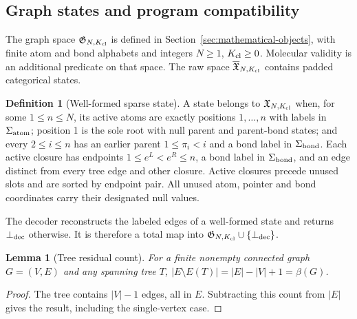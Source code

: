 \documentclass{article}
\newtheorem{lemma}[theorem]{Lemma}
\theoremstyle{definition}
\newtheorem{definition}[theorem]{Definition}
\begin{document}
\subsection{Graph states and program compatibility}
\label{app:state-support}

The graph space $\mathfrak G_{N,K_{\rm cl}}$ is defined in
Section~\ref{sec:mathematical-objects}, with finite atom and bond alphabets and integers $N\geq1$,
$K_{\rm cl}\geq0$. Molecular validity is an additional predicate on that space.
The raw space $\overline{\mathfrak X}_{N,K_{\rm cl}}$ contains padded categorical states.

\begin{definition}[Well-formed sparse state]
\label{def:sparse-state}
A state belongs to $\mathfrak X_{N,K_{\rm cl}}$ when, for some $1\leq n\leq N$, its active atoms
are exactly positions $1,\ldots,n$ with labels in $\Sigma_{\rm atom}$; position 1 is the sole root
with null parent and parent-bond states; and every $2\leq i\leq n$ has an earlier parent
$1\leq\pi_i<i$ and a bond label in $\Sigma_{\rm bond}$. Each active closure has endpoints
$1\leq e^L<e^R\leq n$, a bond label in $\Sigma_{\rm bond}$, and an edge distinct from every tree
edge and other closure. Active closures precede unused slots and are sorted by endpoint pair.
All unused atom, pointer and bond coordinates carry their designated null values.
\end{definition}
The decoder reconstructs the labeled edges of a well-formed state and returns $\bot_{\rm dec}$
otherwise. It is therefore a total map into $\mathfrak G_{N,K_{\rm cl}}\cup\{\bot_{\rm dec}\}$.

\begin{lemma}[Tree residual count]
\label{lem:tree-closure}
For a finite nonempty connected graph $G=(V,E)$ and any spanning tree $T$,
$|E\setminus E(T)|=|E|-|V|+1=\beta(G)$.
\end{lemma}
\begin{proof}
The tree contains $|V|-1$ edges, all in $E$. Subtracting this count from $|E|$ gives the result,
including the single-vertex case.
\end{proof}
\end{document}
